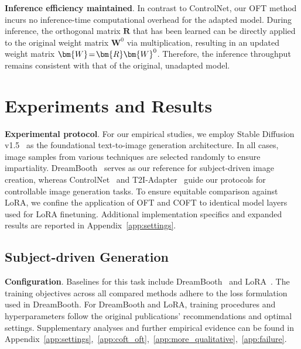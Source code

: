 \textbf{Inference efficiency maintained}. In contrast to ControlNet, our OFT method incurs no inference-time computational overhead for the adapted model. During inference, the orthogonal matrix $\bm{R}$ that has been learned can be directly applied to the original weight matrix $\bm{W}^0$ via multiplication, resulting in an updated weight matrix $\thickmuskip=2mu \medmuskip=2mu \bm{W}=\bm{R}\bm{W}^0$. Therefore, the inference throughput remains consistent with that of the original, unadapted model.

\section{Experiments and Results}

\textbf{Experimental protocol}. For our empirical studies, we employ Stable Diffusion v1.5~\cite{rombach2022high} as the foundational text-to-image generation architecture. In all cases, image samples from various techniques are selected randomly to ensure impartiality. DreamBooth~\cite{ruiz2023dreambooth} serves as our reference for subject-driven image creation, whereas ControlNet~\cite{zhang2023adding} and T2I-Adapter~\cite{mou2023t2i} guide our protocols for controllable image generation tasks. To ensure equitable comparison against LoRA, we confine the application of OFT and COFT to identical model layers used for LoRA finetuning. Additional implementation specifics and expanded results are reported in Appendix~\ref{app:settings}.

\subsection{Subject-driven Generation}

\textbf{Configuration}. Baselines for this task include DreamBooth~\cite{ruiz2023dreambooth} and LoRA~\cite{hulora2022}. The training objectives across all compared methods adhere to the loss formulation used in DreamBooth. For DreamBooth and LoRA, training procedures and hyperparameters follow the original publications' recommendations and optimal settings. Supplementary analyses and further empirical evidence can be found in Appendix~\ref{app:settings},~\ref{app:coft_oft},~\ref{app:more_qualitative},~\ref{app:failure}.

